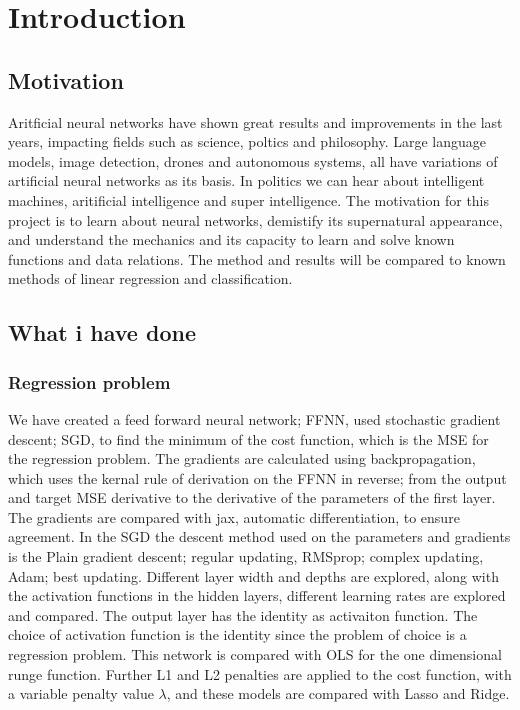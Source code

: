 \section{Introduction}
\label{sec:introduction}

\subsection{Motivation} 
Aritficial neural networks have shown great results
and improvements in the last years, impacting fields such 
as science, poltics and philosophy. Large language models, image detection,
drones and autonomous systems, all have variations of 
artificial neural networks as its basis. In politics we can hear
about intelligent machines, aritificial intelligence and super intelligence.
The motivation for this project is to learn about neural networks, demistify
its supernatural appearance, and understand the mechanics
and its capacity to learn and solve known functions and data relations.  
The method and results will be compared to known methods of linear
regression and classification. 
\subsection{What i have done}
\subsubsection{Regression problem}
We have created a feed forward neural network; FFNN, used stochastic gradient descent; SGD,
to find the minimum of the cost function, which is the MSE for the regression problem. 
The gradients are calculated using backpropagation, which uses the kernal rule of derivation
on the FFNN in reverse; from the output and target MSE derivative to the
derivative of the parameters of the first layer. 
The gradients are compared with jax, automatic differentiation,
to ensure agreement. In the SGD the descent method used on the parameters and gradients
is the Plain gradient descent; regular updating, 
RMSprop; complex updating, Adam; best updating.  
Different layer width and depths are explored, along with the activation functions
in the hidden layers, different learning rates are explored and compared. 
The output layer has the identity as activaiton function.
The choice of activation function is the identity since the problem of choice is a 
regression problem. This network is compared with OLS for the one dimensional runge function.
Further L1 and L2 penalties are applied to the cost function, with a variable
penalty value $\lambda$, and these models are compared with Lasso and Ridge.  
